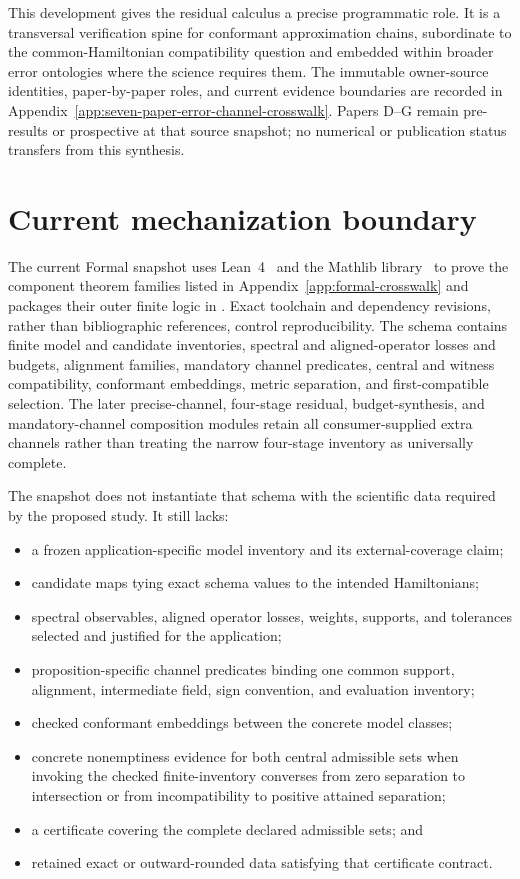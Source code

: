 This development gives the residual calculus a precise programmatic role.  It is a
transversal verification spine for conformant approximation chains, subordinate to the
common-Hamiltonian compatibility question and embedded within broader error ontologies
where the science requires them.  The immutable owner-source identities, paper-by-paper
roles, and current evidence boundaries are recorded in
Appendix~\ref{app:seven-paper-error-channel-crosswalk}.  Papers D--G remain pre-results
or prospective at that source snapshot; no numerical or publication status transfers
from this synthesis.

\section{Current mechanization boundary}

The current Formal snapshot uses Lean~4~\cite{DeMouraUllrich2021} and the Mathlib
library~\cite{MathlibCommunity2020} to prove the component theorem families listed in
Appendix~\ref{app:formal-crosswalk} and packages their outer finite logic in
. Exact toolchain and dependency revisions, rather than
bibliographic references, control reproducibility. The schema contains finite model and candidate
inventories, spectral and aligned-operator losses and budgets, alignment families,
mandatory channel predicates, central and witness compatibility, conformant embeddings,
metric separation, and first-compatible selection.  The later precise-channel,
four-stage residual, budget-synthesis, and mandatory-channel composition modules retain
all consumer-supplied extra channels rather than treating the narrow four-stage inventory
as universally complete.

The snapshot does not instantiate that schema with the scientific data required by the
proposed study.  It still lacks:

\begin{itemize}
  \item a frozen application-specific model inventory and its external-coverage claim;
  \item candidate maps tying exact schema values to the intended Hamiltonians;
  \item spectral observables, aligned operator losses, weights, supports, and tolerances
        selected and justified for the application;
  \item proposition-specific channel predicates binding one common support, alignment,
        intermediate field, sign convention, and evaluation inventory;
  \item checked conformant embeddings between the concrete model classes;
  \item concrete nonemptiness evidence for both central admissible sets when invoking
        the checked finite-inventory converses from zero separation to intersection or
        from incompatibility to positive attained separation;
  \item a certificate covering the complete declared admissible sets; and
  \item retained exact or outward-rounded data satisfying that certificate contract.
\end{itemize}

